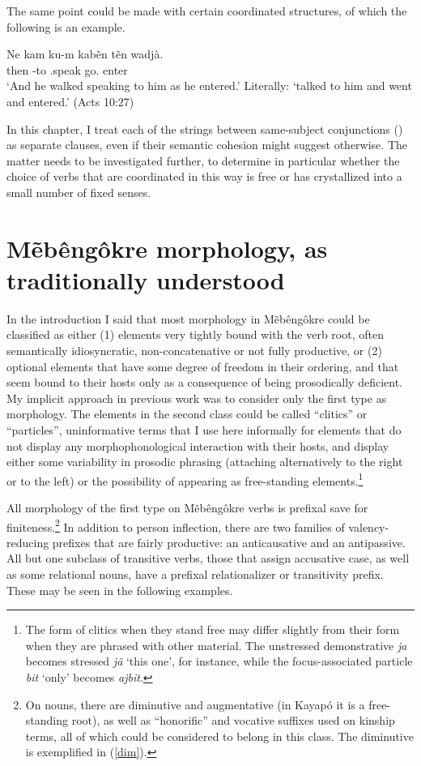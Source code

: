 \documentclass[output=paper]{langscibook}
\begin{document}
The same point could be made with certain coordinated structures, of which the following is an example.

\ea\gll Ne kam ku-m kabẽn tẽn wadjà.\\
      \Ss{} then \Third\Acc{}-to \Third.speak go.\Ss{} enter\\
    \glt `And he walked speaking to him as he entered.' Literally: `talked to him and went and entered.' (Acts 10:27)
\z

In this chapter, I treat each of the strings between same-subject conjunctions () as separate clauses, even if their semantic cohesion might suggest otherwise. The matter needs to be investigated further, to determine in particular whether the choice of verbs that are coordinated in this way is free or has crystallized into a small number of fixed senses. %

\section{Mẽbêngôkre morphology, as traditionally understood}

In the introduction I said that most morphology in Mẽbêngôkre could be classified as either (1) elements very tightly bound with the verb root, often semantically idiosyncratic, non-concatenative or not fully productive, or (2) optional elements that have some degree of freedom in their ordering, and that seem bound to their hosts only as a consequence of being prosodically deficient. My implicit approach in previous work was to consider only the first type as morphology. The elements in the second class could be called ``clitics'' or ``particles'', uninformative terms that I use here informally for elements that do not display any morphophonological interaction with their hosts, and display either some variability in prosodic phrasing (attaching alternatively to the right or to the left) or the possibility of appearing as free-standing elements.\footnote{The form of clitics when they stand free may differ slightly from their form when they are phrased with other material. The unstressed demonstrative {\em ja} becomes stressed {\em jã} `this one', for instance, while the focus-associated particle {\em bit} `only' becomes {\em ajbit}.}

All morphology of the first type on Mẽbêngôkre verbs is prefixal save for finiteness.\footnote{On nouns, there are diminutive and augmentative (in Kayapó it is a free-standing root), as well as ``honorific'' and vocative suffixes used on kinship terms, all of which could be considered to belong in this class. The diminutive is exemplified in (\ref{dim}).} In addition to person inflection, there are two families of valency-reducing prefixes that are fairly productive: an anticausative and an antipassive. All but one subclass of transitive verbs, those that assign accusative case, as well as some relational nouns, have a prefixal relationalizer or transitivity prefix. These may be seen in the following examples.
\end{document}
